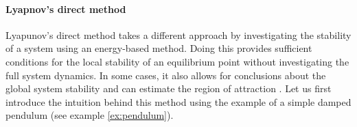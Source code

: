 \paragraph{Lyapnov's direct method}

Lyapunov's direct method takes a different approach by investigating the stability of a system using an energy-based method. Doing this provides sufficient conditions for the local stability of an equilibrium point without investigating the full system dynamics. In some cases, it also allows for conclusions about the global system stability and can estimate the region of attraction \cite{khalilNonlinearSystems2002}. Let us first introduce the intuition behind this method using the example of a simple damped pendulum (see example \ref{ex:pendulum}).

